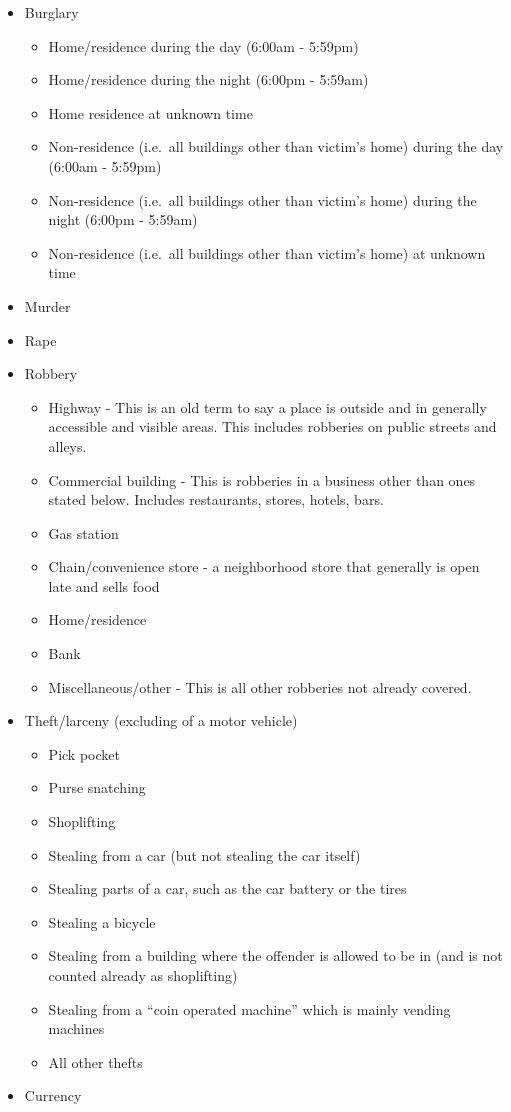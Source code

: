 \documentclass[
  12pt,
  openany]{book}
\providecommand{\tightlist}{%
  \setlength{\itemsep}{0pt}\setlength{\parskip}{0pt}}
\begin{document}
\begin{itemize}
\tightlist
\item
  Burglary

  \begin{itemize}
  \tightlist
  \item
    Home/residence during the day (6:00am - 5:59pm)
  \item
    Home/residence during the night (6:00pm - 5:59am)
  \item
    Home residence at unknown time
  \item
    Non-residence (i.e.~all buildings other than victim's home) during the day (6:00am - 5:59pm)
  \item
    Non-residence (i.e.~all buildings other than victim's home) during the night (6:00pm - 5:59am)
  \item
    Non-residence (i.e.~all buildings other than victim's home) at unknown time
  \end{itemize}
\item
  Murder
\item
  Rape
\item
  Robbery

  \begin{itemize}
  \tightlist
  \item
    Highway - This is an old term to say a place is outside and in generally accessible and visible areas. This includes robberies on public streets and alleys.
  \item
    Commercial building - This is robberies in a business other than ones stated below. Includes restaurants, stores, hotels, bars.
  \item
    Gas station
  \item
    Chain/convenience store - a neighborhood store that generally is open late and sells food
  \item
    Home/residence
  \item
    Bank
  \item
    Miscellaneous/other - This is all other robberies not already covered.
  \end{itemize}
\item
  Theft/larceny (excluding of a motor vehicle)

  \begin{itemize}
  \tightlist
  \item
    Pick pocket
  \item
    Purse snatching
  \item
    Shoplifting
  \item
    Stealing from a car (but not stealing the car itself)
  \item
    Stealing parts of a car, such as the car battery or the tires
  \item
    Stealing a bicycle
  \item
    Stealing from a building where the offender is allowed to be in (and is not counted already as shoplifting)
  \item
    Stealing from a ``coin operated machine'' which is mainly vending machines
  \item
    All other thefts
  \end{itemize}
\item
  Currency


\end{itemize}
\end{document}
